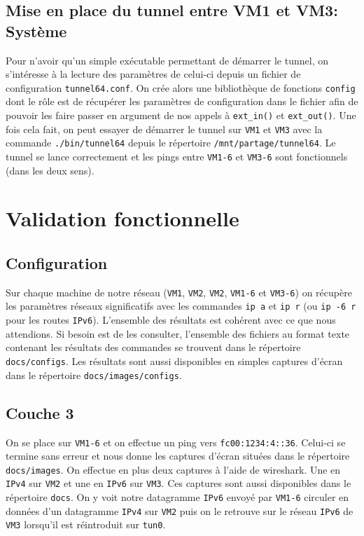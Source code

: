 \documentclass[a4paper, 12pt]{article}
\begin{document}
\begin{spacing}{1.1}
    \subsection{Mise en place du tunnel entre VM1 et VM3: Système}

    Pour n'avoir qu'un simple exécutable permettant de démarrer le tunnel, on 
    s'intéresse à la lecture des paramètres de celui-ci depuis un fichier de 
    configuration \verb+tunnel64.conf+. On crée alors une bibliothèque de
    fonctions \verb+config+ dont le rôle est de récupérer les paramètres de 
    configuration dans le fichier afin de pouvoir les faire passer en argument
    de nos appels à \verb+ext_in()+ et \verb+ext_out()+. Une fois cela fait, 
    on peut essayer de démarrer le tunnel sur \verb+VM1+ et \verb+VM3+ avec la 
    commande \verb+./bin/tunnel64+ depuis le répertoire \verb+/mnt/partage/tunnel64+.
    Le tunnel se lance correctement et les pings entre \verb+VM1-6+ et \verb+VM3-6+ 
    sont fonctionnels (dans les deux sens).

    \section{Validation fonctionnelle}

    \subsection{Configuration}

    Sur chaque machine de notre réseau (\verb+VM1+, \verb+VM2+, \verb+VM2+, 
    \verb+VM1-6+ et \verb+VM3-6+) on récupère les paramètres réseaux 
    significatifs avec les commandes \verb+ip a+ et \verb+ip r+ (ou \verb+ip -6 r+
    pour les routes \verb+IPv6+). L'ensemble des résultats est cohérent avec ce 
    que nous attendions. Si besoin est de les consulter, l'ensemble des fichiers 
    au format texte contenant les résultats des commandes se trouvent dans le 
    répertoire \verb+docs/configs+. Les résultats sont aussi disponibles en simples 
    captures d'écran dans le répertoire \verb+docs/images/configs+.

    \subsection{Couche 3}

    On se place sur \verb+VM1-6+ et on effectue un ping vers \verb+fc00:1234:4::36+.
    Celui-ci se termine sans erreur et nous donne les captures d'écran situées dans 
    le répertoire \verb+docs/images+. On effectue en plus deux captures à l'aide de 
    wireshark. Une en \verb+IPv4+ sur \verb+VM2+ et une en \verb+IPv6+ sur \verb+VM3+.
    Ces captures sont aussi disponibles dans le répertoire \verb+docs+. On y voit 
    notre datagramme \verb+IPv6+ envoyé par \verb+VM1-6+ circuler en données d'un 
    datagramme \verb+IPv4+ sur \verb+VM2+ puis on le retrouve sur le réseau 
    \verb+IPv6+ de \verb+VM3+ lorsqu'il est réintroduit sur \verb+tun0+.


\end{spacing}
\end{document}
